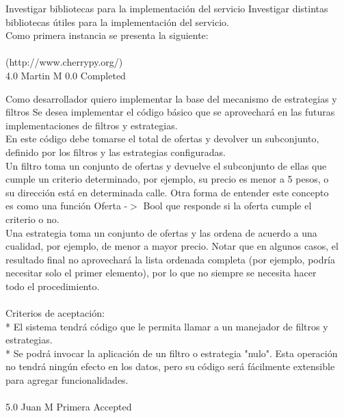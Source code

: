 		{Investigar bibliotecas para la implementación del servicio} %
		{Investigar distintas bibliotecas útiles para la implementación del servicio.\\
Como primera instancia se presenta la siguiente:\\
  \\
[http://www.cherrypy.org/](http://www.cherrypy.org/)\\
} %
		{4.0} %
		{Martin M} %
		{0.0} %
		{Completed} %


\vspace{20pt}

	{Como desarrollador quiero implementar la base del mecanismo de estrategias y filtros} %
	{Se desea implementar el código básico que se aprovechará en las futuras\\
implementaciones de filtros y estrategias.\\
En este código debe tomarse el total de ofertas y devolver un subconjunto,\\
definido por los filtros y  las estrategias configuradas.\\
Un filtro toma un conjunto de ofertas y devuelve el subconjunto de ellas que\\
cumple un criterio determinado, por ejemplo, su precio es menor a 5 pesos, o\\
su dirección está en determinada calle. Otra forma de entender este concepto\\
es como una función Oferta -$>$  Bool que responde si la oferta cumple el\\
criterio o no.\\
Una estrategia toma un conjunto de ofertas y las ordena de acuerdo a una\\
cualidad, por ejemplo, de menor a mayor precio. Notar que en algunos casos, el\\
resultado final no aprovechará la lista ordenada completa (por ejemplo, podría\\
necesitar solo el primer elemento), por lo que no siempre se necesita hacer\\
todo el procedimiento.\\
  \\
Criterios de aceptación:\\
* El sistema tendrá código que le permita llamar a un manejador de filtros y estrategias.  \\
* Se podrá invocar la aplicación de un filtro o estrategia "nulo". Esta operación no tendrá ningún efecto en los datos, pero su código será fácilmente extensible para agregar funcionalidades.  \\
  \\
} %
	{} %
	{5.0} %
	{Juan M} %
	{Primera} %
	{Accepted} %

